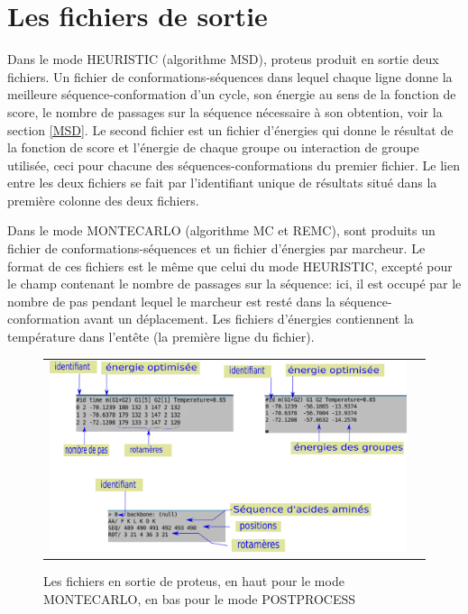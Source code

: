 \section{Les fichiers de sortie}
\label{proteusIO}
Dans le mode HEURISTIC (algorithme MSD), proteus produit en sortie deux fichiers. Un fichier de conformations-séquences dans lequel chaque ligne donne la meilleure séquence-conformation d'un cycle, son énergie au sens de la fonction de score, le nombre de passages sur la séquence nécessaire à son obtention, voir la section \vref{MSD}. Le second fichier est un fichier d'énergies qui donne le résultat de la fonction de score et l'énergie de chaque groupe ou interaction de groupe utilisée, ceci pour chacune des séquences-conformations du premier fichier. Le lien entre les deux fichiers se fait par l'identifiant unique de résultats situé dans la première colonne des deux fichiers.

Dans le mode MONTECARLO (algorithme MC et REMC), sont produits un fichier de conformations-séquences et un fichier d'énergies par marcheur. Le format de ces fichiers est le même que celui du mode HEURISTIC, excepté pour le champ contenant le nombre de passages sur la séquence: ici, il est occupé par le nombre de pas pendant lequel le marcheur est resté dans la séquence-conformation avant un déplacement. Les fichiers d'énergies contiennent la température dans l'entête (la première ligne du fichier).

   \begin{figure}[!htbp]
     \centering
     \begin{tabular}{cc}
       \includegraphics[width=14cm]{figure/output.png} &
     \end{tabular}
     
     \caption{Les fichiers en sortie de proteus, en haut pour le mode MONTECARLO, en bas pour le mode POSTPROCESS}
\label{proteusoutput}
   \end{figure}

